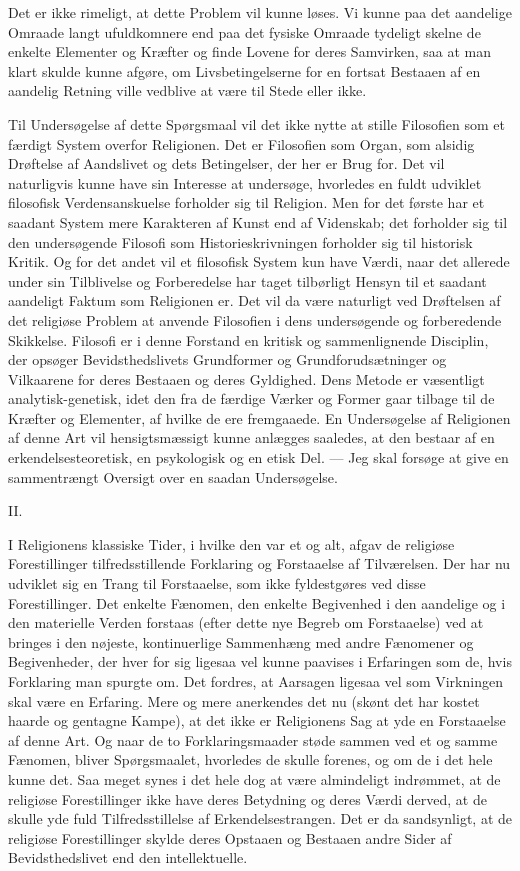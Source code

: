 \documentclass[12pt,a4paper]{article}
\newcommand{\snum}[1]{\bigskip\begin{center}#1\end{center}\nopagebreak\medskip}
\newcommand{\opage}[1]{\marginnote{\footnotesize\textit{[#1]}}}
\begin{document}
Det er ikke rimeligt, at dette Problem vil kunne løses. Vi kunne paa det
aandelige Omraade langt ufuldkomnere end paa det fysiske Omraade tydeligt
skelne de enkelte Elementer og Kræfter og finde Lovene for deres Samvirken,
saa at man klart skulde kunne afgøre, om Livsbetingelserne for en fortsat
Bestaaen af en aandelig Retning ville vedblive at være til Stede eller ikke.

Til Undersøgelse af dette Spørgsmaal vil det ikke nytte at stille Filosofien
som et færdigt System overfor Religionen. Det er Filosofien som Organ, som
alsidig Drøftelse af Aandslivet og dets Betingelser, der her er Brug for. Det
vil naturligvis kunne have sin Interesse at undersøge, hvorledes en fuldt
udviklet filosofisk Verdensanskuelse forholder sig til Religion. Men for det
første har et saadant System mere Karakteren af Kunst end af Videnskab; det
forholder sig til den undersøgende Filosofi som Historieskrivningen forholder
sig til historisk Kritik. Og for det andet vil et filosofisk System kun have
Værdi, naar det allerede under sin Tilblivelse og Forberedelse har taget
tilbørligt Hensyn til et saadant aandeligt Faktum som Religionen er.
\opage{414} Det vil da være naturligt ved Drøftelsen af det religiøse Problem at anvende
Filosofien i dens undersøgende og forberedende Skikkelse. Filosofi er i denne
Forstand en kritisk og sammenlignende Disciplin, der opsøger Bevidsthedslivets
Grundformer og Grundforudsætninger og Vilkaarene for deres Bestaaen og deres
Gyldighed. Dens Metode er væsentligt analytisk-genetisk, idet den fra de
færdige Værker og Former gaar tilbage til de Kræfter og Elementer, af hvilke
de ere fremgaaede. En Undersøgelse af Religionen af denne Art vil
hensigtsmæssigt kunne anlægges saaledes, at den bestaar af en
erkendelsesteoretisk, en psykologisk og en etisk Del. --- Jeg skal forsøge at
give en sammentrængt Oversigt over en saadan Undersøgelse.

\snum{II.}

I Religionens klassiske Tider, i hvilke den var et og alt, afgav de religiøse
Forestillinger tilfredsstillende Forklaring og Forstaaelse af Tilværelsen. Der
har nu udviklet sig en Trang til Forstaaelse, som ikke fyldestgøres ved disse
Forestillinger. Det enkelte Fænomen, den enkelte Begivenhed i den aandelige og
i den materielle Verden forstaas (efter dette nye Begreb om Forstaaelse) ved
at bringes i den nøjeste, kontinuerlige Sammenhæng med andre Fænomener og
Begivenheder, der hver for sig ligesaa vel kunne paavises i Erfaringen som de,
hvis Forklaring man spurgte om. Det fordres, at Aarsagen ligesaa vel som
Virkningen skal være en Erfaring. Mere og mere anerkendes det nu (skønt det
har kostet haarde og gentagne Kampe), at det ikke er Religionens Sag at yde en
Forstaaelse af denne Art. Og naar de to Forklaringsmaader støde sammen ved et
og samme Fænomen, bliver Spørgsmaalet, hvorledes de skulle forenes, og om de i
det hele kunne det. Saa meget synes i det hele dog at være almindeligt
indrømmet, at de religiøse Forestillinger ikke have deres Betydning og deres
Værdi derved, at de skulle yde fuld Tilfredsstillelse af Erkendelsestrangen.
Det
\opage{415} er da sandsynligt, at de religiøse Forestillinger skylde deres Opstaaen og
Bestaaen andre Sider af Bevidsthedslivet end den intellektuelle.
\end{document}
